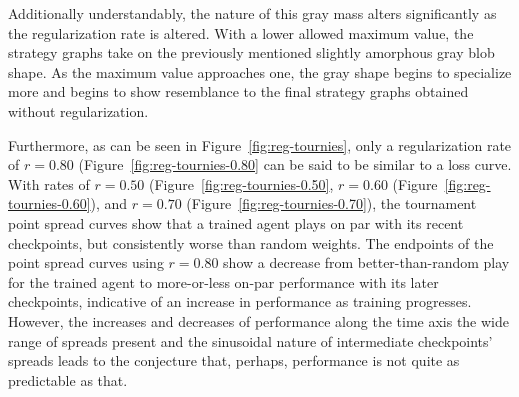 Additionally understandably,
the nature of this gray mass alters significantly as the regularization rate is
altered.
%
With a lower allowed maximum value,
the strategy graphs take on the previously mentioned slightly amorphous gray
blob shape.
%
As the maximum value approaches one,
the gray shape begins to specialize more and begins to show resemblance to the
final strategy graphs obtained without regularization.



Furthermore,
as can be seen in Figure~\ref{fig:reg-tournies},
only a regularization rate of $r = 0.80$ (Figure~\ref{fig:reg-tournies-0.80}
can be said to be similar to a loss curve.
%
With rates of $r=0.50$ (Figure~\ref{fig:reg-tournies-0.50},
$r = 0.60$ (Figure~\ref{fig:reg-tournies-0.60}),
and $r = 0.70$ (Figure~\ref{fig:reg-tournies-0.70}),
the tournament point spread curves show that a trained agent plays on par with
its recent checkpoints,
but consistently worse than random weights.
%
The endpoints of the point spread curves using $r = 0.80$
show a decrease from better-than-random play for the trained agent
to more-or-less on-par performance with its later checkpoints,
indicative of an increase in performance as training progresses.
%
However,
the increases and decreases of performance along the time axis
the wide range of spreads present and the sinusoidal nature of intermediate
checkpoints' spreads leads to the conjecture that, perhaps,
performance is not quite as predictable as that.


